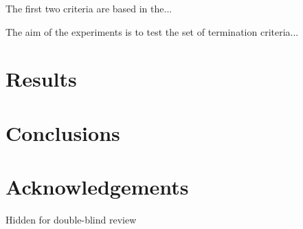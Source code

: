 \documentclass[runningheads,a4paper]{llncs}
\begin{document}
The first two criteria are based in the...

The aim of the experiments is to test the set of termination criteria...

\section{Results}
\label{sec:res}

\section{Conclusions}

\section*{Acknowledgements}

Hidden for double-blind review



\end{document}
